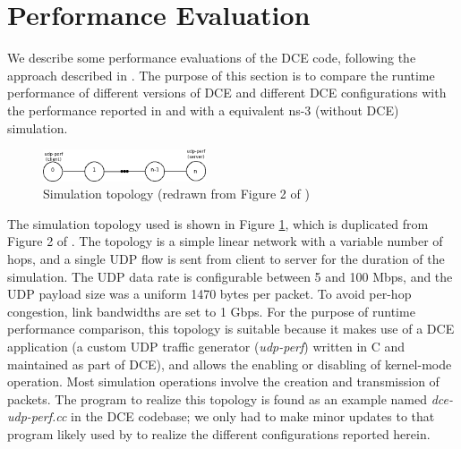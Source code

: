 \documentclass{sig-alternate}
\begin{document}

\section{Performance Evaluation}
We describe some performance evaluations of the DCE code, following the
approach described in \cite{Tazaki13}.  The purpose of this section is to
compare the runtime performance of different versions of DCE and different
DCE configurations with the performance reported in \cite{Tazaki13} and with
a equivalent ns-3 (without DCE) simulation.

\begin{figure}[h!]
  \centering
    \includegraphics[width=0.43\textwidth]{figs/topology.png}
  \caption{Simulation topology (redrawn from Figure 2 of \cite{Tazaki13})}
  \label{fig:topology}
\end{figure}

The simulation topology used is shown in Figure \ref{fig:topology}, which
is duplicated from Figure 2 of \cite{Tazaki13}.  The topology is a simple
linear network with a variable number of hops, and a single UDP flow
is sent from client to server for the duration of the simulation.
The UDP data rate is configurable between 5 and 100 Mbps, and the UDP
payload size was a uniform 1470 bytes per packet.
To avoid per-hop congestion, link bandwidths are set to 1 Gbps.
For the purpose of runtime performance comparison, this topology is
suitable because it makes use of a DCE application (a custom UDP traffic
generator (\emph{udp-perf}) written in C and maintained as part of DCE),
and allows the enabling or disabling of kernel-mode operation.  Most
simulation operations involve the creation and transmission of packets.
The program to realize this topology is found as an example named
\emph{dce-udp-perf.cc} in the DCE codebase; we only had to make minor
updates to that program likely used by \cite{Tazaki13} to realize the
different configurations reported herein.
\end{document}
